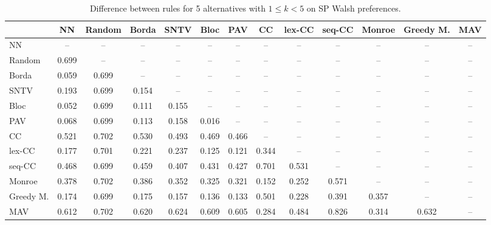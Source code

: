 
\begin{table*}[h!]
\centering
\begin{tabular}{lcccccccccccc}
\toprule
 & NN & Random & Borda & SNTV & Bloc & PAV & CC & lex-CC & seq-CC & Monroe & Greedy M. & MAV \\
\midrule
NN & -- & -- & -- & -- & -- & -- & -- & -- & -- & -- & -- & -- \\
Random & 0.699 & -- & -- & -- & -- & -- & -- & -- & -- & -- & -- & -- \\
Borda & 0.059 & 0.699 & -- & -- & -- & -- & -- & -- & -- & -- & -- & -- \\
SNTV & 0.193 & 0.699 & 0.154 & -- & -- & -- & -- & -- & -- & -- & -- & -- \\
Bloc & 0.052 & 0.699 & 0.111 & 0.155 & -- & -- & -- & -- & -- & -- & -- & -- \\
PAV & 0.068 & 0.699 & 0.113 & 0.158 & 0.016 & -- & -- & -- & -- & -- & -- & -- \\
CC & 0.521 & 0.702 & 0.530 & 0.493 & 0.469 & 0.466 & -- & -- & -- & -- & -- & -- \\
lex-CC & 0.177 & 0.701 & 0.221 & 0.237 & 0.125 & 0.121 & 0.344 & -- & -- & -- & -- & -- \\
seq-CC & 0.468 & 0.699 & 0.459 & 0.407 & 0.431 & 0.427 & 0.701 & 0.531 & -- & -- & -- & -- \\
Monroe & 0.378 & 0.702 & 0.386 & 0.352 & 0.325 & 0.321 & 0.152 & 0.252 & 0.571 & -- & -- & -- \\
Greedy M. & 0.174 & 0.699 & 0.175 & 0.157 & 0.136 & 0.133 & 0.501 & 0.228 & 0.391 & 0.357 & -- & -- \\
MAV & 0.612 & 0.702 & 0.620 & 0.624 & 0.609 & 0.605 & 0.284 & 0.484 & 0.826 & 0.314 & 0.632 & -- \\
\bottomrule
\end{tabular}

\caption{Difference between rules for 5 alternatives with $1 \leq k < 5$ on SP Walsh preferences.}
\end{table*}
